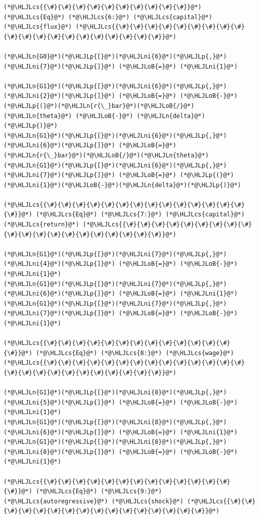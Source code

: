 \documentclass[12pt,a4paper]{article}
\newcommand{\HLJLn}[1]{#1}
\newcommand{\HLJLni}[1]{\textcolor[RGB]{59,151,46}{#1}}
\newcommand{\HLJLoB}[1]{\textcolor[RGB]{102,102,102}{\textbf{#1}}}
\newcommand{\HLJLp}[1]{#1}
\newcommand{\HLJLcs}[1]{\textcolor[RGB]{153,153,119}{\textit{#1}}}
\begin{document}
\begin{lstlisting}
(*@\HLJLcs{{\#}{\#}{\#}{\#}{\#}{\#}{\#}{\#}{\#}{\#}}@*) (*@\HLJLcs{Eq}@*) (*@\HLJLcs{6:}@*) (*@\HLJLcs{capital}@*) (*@\HLJLcs{flux}@*) (*@\HLJLcs{{\#}{\#}{\#}{\#}{\#}{\#}{\#}{\#}{\#}{\#}{\#}{\#}{\#}{\#}{\#}{\#}{\#}{\#}{\#}{\#}}@*)

(*@\HLJLn{G0}@*)(*@\HLJLp{[}@*)(*@\HLJLni{6}@*)(*@\HLJLp{,}@*)(*@\HLJLni{7}@*)(*@\HLJLp{]}@*) (*@\HLJLoB{=}@*) (*@\HLJLni{1}@*)

(*@\HLJLn{G1}@*)(*@\HLJLp{[}@*)(*@\HLJLni{6}@*)(*@\HLJLp{,}@*)(*@\HLJLni{2}@*)(*@\HLJLp{]}@*) (*@\HLJLoB{=}@*) (*@\HLJLoB{-}@*)(*@\HLJLp{(}@*)(*@\HLJLn{r{\_}bar}@*)(*@\HLJLoB{/}@*)(*@\HLJLn{theta}@*) (*@\HLJLoB{-}@*) (*@\HLJLn{delta}@*)(*@\HLJLp{)}@*)
(*@\HLJLn{G1}@*)(*@\HLJLp{[}@*)(*@\HLJLni{6}@*)(*@\HLJLp{,}@*)(*@\HLJLni{6}@*)(*@\HLJLp{]}@*) (*@\HLJLoB{=}@*) (*@\HLJLn{r{\_}bar}@*)(*@\HLJLoB{/}@*)(*@\HLJLn{theta}@*)
(*@\HLJLn{G1}@*)(*@\HLJLp{[}@*)(*@\HLJLni{6}@*)(*@\HLJLp{,}@*)(*@\HLJLni{7}@*)(*@\HLJLp{]}@*) (*@\HLJLoB{=}@*) (*@\HLJLp{(}@*)(*@\HLJLni{1}@*)(*@\HLJLoB{-}@*)(*@\HLJLn{delta}@*)(*@\HLJLp{)}@*)

(*@\HLJLcs{{\#}{\#}{\#}{\#}{\#}{\#}{\#}{\#}{\#}{\#}{\#}{\#}{\#}{\#}{\#}}@*) (*@\HLJLcs{Eq}@*) (*@\HLJLcs{7:}@*) (*@\HLJLcs{capital}@*) (*@\HLJLcs{return}@*) (*@\HLJLcs{{\#}{\#}{\#}{\#}{\#}{\#}{\#}{\#}{\#}{\#}{\#}{\#}{\#}{\#}{\#}{\#}{\#}{\#}{\#}{\#}}@*)

(*@\HLJLn{G1}@*)(*@\HLJLp{[}@*)(*@\HLJLni{7}@*)(*@\HLJLp{,}@*)(*@\HLJLni{4}@*)(*@\HLJLp{]}@*) (*@\HLJLoB{=}@*) (*@\HLJLoB{-}@*)(*@\HLJLni{1}@*)
(*@\HLJLn{G1}@*)(*@\HLJLp{[}@*)(*@\HLJLni{7}@*)(*@\HLJLp{,}@*)(*@\HLJLni{6}@*)(*@\HLJLp{]}@*) (*@\HLJLoB{=}@*) (*@\HLJLni{1}@*)
(*@\HLJLn{G1}@*)(*@\HLJLp{[}@*)(*@\HLJLni{7}@*)(*@\HLJLp{,}@*)(*@\HLJLni{7}@*)(*@\HLJLp{]}@*) (*@\HLJLoB{=}@*) (*@\HLJLoB{-}@*)(*@\HLJLni{1}@*)

(*@\HLJLcs{{\#}{\#}{\#}{\#}{\#}{\#}{\#}{\#}{\#}{\#}{\#}{\#}{\#}{\#}}@*) (*@\HLJLcs{Eq}@*) (*@\HLJLcs{8:}@*) (*@\HLJLcs{wage}@*) (*@\HLJLcs{{\#}{\#}{\#}{\#}{\#}{\#}{\#}{\#}{\#}{\#}{\#}{\#}{\#}{\#}{\#}{\#}{\#}{\#}{\#}{\#}{\#}{\#}{\#}{\#}{\#}}@*)

(*@\HLJLn{G1}@*)(*@\HLJLp{[}@*)(*@\HLJLni{8}@*)(*@\HLJLp{,}@*)(*@\HLJLni{5}@*)(*@\HLJLp{]}@*) (*@\HLJLoB{=}@*) (*@\HLJLoB{-}@*)(*@\HLJLni{1}@*)
(*@\HLJLn{G1}@*)(*@\HLJLp{[}@*)(*@\HLJLni{8}@*)(*@\HLJLp{,}@*)(*@\HLJLni{6}@*)(*@\HLJLp{]}@*) (*@\HLJLoB{=}@*) (*@\HLJLni{1}@*)
(*@\HLJLn{G1}@*)(*@\HLJLp{[}@*)(*@\HLJLni{8}@*)(*@\HLJLp{,}@*)(*@\HLJLni{8}@*)(*@\HLJLp{]}@*) (*@\HLJLoB{=}@*) (*@\HLJLoB{-}@*)(*@\HLJLni{1}@*)

(*@\HLJLcs{{\#}{\#}{\#}{\#}{\#}{\#}{\#}{\#}{\#}{\#}{\#}{\#}{\#}{\#}}@*) (*@\HLJLcs{Eq}@*) (*@\HLJLcs{9:}@*) (*@\HLJLcs{autoregressive}@*) (*@\HLJLcs{shock}@*) (*@\HLJLcs{{\#}{\#}{\#}{\#}{\#}{\#}{\#}{\#}{\#}{\#}{\#}{\#}{\#}{\#}{\#}{\#}}@*)


\end{lstlisting}
\end{document}
